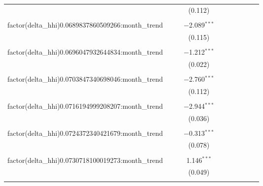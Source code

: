 \begin{table}[H]
{\begin{tabular}{@{\extracolsep{5pt}}lccccccccc}
   &  &  & (0.112) &  &  &  &  &  &  \\  

   & & & & & & & & & \\  

  factor(delta\_hhi)0.0689837860509266:month\_trend &  &  & $-$2.089$^{***}$ &  &  &  &  &  &  \\  

   &  &  & (0.115) &  &  &  &  &  &  \\  

   & & & & & & & & & \\  

  factor(delta\_hhi)0.0696047932644834:month\_trend &  &  & $-$1.212$^{***}$ &  &  &  &  &  &  \\  

   &  &  & (0.022) &  &  &  &  &  &  \\  

   & & & & & & & & & \\  

  factor(delta\_hhi)0.0703847340698046:month\_trend &  &  & $-$2.760$^{***}$ &  &  &  &  &  &  \\  

   &  &  & (0.112) &  &  &  &  &  &  \\  

   & & & & & & & & & \\  

  factor(delta\_hhi)0.0716194999208207:month\_trend &  &  & $-$2.944$^{***}$ &  &  &  &  &  &  \\  

   &  &  & (0.036) &  &  &  &  &  &  \\  

   & & & & & & & & & \\  

  factor(delta\_hhi)0.0724372340421679:month\_trend &  &  & $-$0.313$^{***}$ &  &  &  &  &  &  \\  

   &  &  & (0.078) &  &  &  &  &  &  \\  

   & & & & & & & & & \\  

  factor(delta\_hhi)0.0730718100019273:month\_trend &  &  & 1.146$^{***}$ &  &  &  &  &  &  \\  

   &  &  & (0.049) &  &  &  &  &  &  \\  

   & & & & & & & & & \\  


\end{tabular}}
\end{table}
